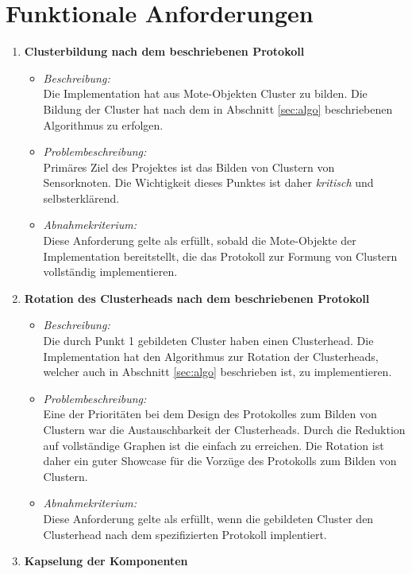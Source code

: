 \section{Funktionale Anforderungen} \label{sec:func}
\begin{enumerate}
\item \textbf{Clusterbildung nach dem beschriebenen Protokoll}
  \begin{itemize}
  \item \emph{Beschreibung:}\\
    Die Implementation hat aus Mote-Objekten Cluster zu bilden. Die Bildung der Cluster hat nach dem in Abschnitt \ref{sec:algo} beschriebenen Algorithmus zu erfolgen.
  \item \emph{Problembeschreibung:}\\
    Prim\"ares Ziel des Projektes ist das Bilden von Clustern von Sensorknoten. Die Wichtigkeit dieses Punktes ist daher \emph{kritisch} und selbsterkl\"arend.
  \item \emph{Abnahmekriterium:}\\
    Diese Anforderung gelte als erf\"ullt, sobald die Mote-Objekte der Implementation bereitstellt, die das Protokoll zur Formung von Clustern vollst\"andig implementieren.
  \end{itemize}
\item \textbf{Rotation des Clusterheads nach dem beschriebenen Protokoll}
  \begin{itemize}
  \item \emph{Beschreibung:}\\
    Die durch Punkt 1 gebildeten Cluster haben einen Clusterhead. Die Implementation hat den Algorithmus zur Rotation der Clusterheads, welcher auch in Abschnitt \ref{sec:algo} beschrieben ist, zu implementieren.
  \item \emph{Problembeschreibung:}\\
    Eine der Priorit\"aten bei dem Design des Protokolles zum Bilden von Clustern war die Austauschbarkeit der Clusterheads. Durch die Reduktion auf vollst\"andige Graphen ist die einfach zu erreichen. Die Rotation ist daher ein guter Showcase f\"ur die Vorz\"uge des Protokolls zum Bilden von Clustern.
  \item \emph{Abnahmekriterium:}\\
    Diese Anforderung gelte als erf\"ullt, wenn die gebildeten Cluster den Clusterhead nach dem spezifizierten Protokoll implentiert.
  \end{itemize}
\item \textbf{Kapselung der Komponenten}

\end{enumerate}
